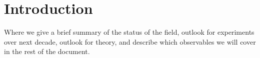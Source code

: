 \section{Introduction}
Where we give a brief summary of the status of the field, outlook for experiments over next decade, outlook for theory, 
and describe which observables we will cover in the rest of the document.
